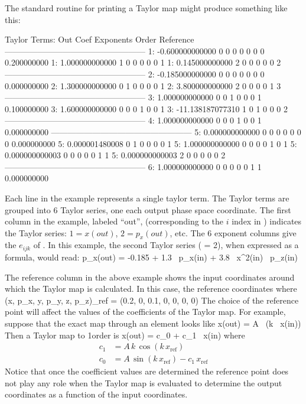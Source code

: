 The standard \bmad routine for printing a Taylor map might produce something 
like this: 
\begin{example}
   Taylor Terms:
    Out     Coef              Exponents           Order        Reference
   ---------------------------------------------------
      1:     -0.600000000000  0  0  0  0  0  0        0       0.200000000
      1:      1.000000000000  1  0  0  0  0  0        1
      1:      0.145000000000  2  0  0  0  0  0        2
   ---------------------------------------------------
      2:     -0.185000000000  0  0  0  0  0  0        0       0.000000000
      2:      1.300000000000  0  1  0  0  0  0        1
      2:      3.800000000000  2  0  0  0  0  1        3
   ---------------------------------------------------
      3:      1.000000000000  0  0  1  0  0  0        1       0.100000000
      3:      1.600000000000  0  0  0  1  0  0        1
      3:    -11.138187077310  1  0  1  0  0  0        2
   ---------------------------------------------------
      4:      1.000000000000  0  0  0  1  0  0        1       0.000000000
   ---------------------------------------------------
      5:      0.000000000000  0  0  0  0  0  0        0       0.000000000
      5:      0.000001480008  0  1  0  0  0  0        1
      5:      1.000000000000  0  0  0  0  1  0        1
      5:      0.000000000003  0  0  0  0  0  1        1
      5:      0.000000000003  2  0  0  0  0  0        2
   ---------------------------------------------------
      6:      1.000000000000  0  0  0  0  0  1        1       0.000000000
\end{example}
Each line in the example represents a single taylor term. The Taylor
terms are grouped into 6 Taylor series, one each output phase space
coordinate.  The first column in the example, labeled ``out'',
(corresponding to the $i$ index in ) indicates the Taylor
series: $1 = x(out)$, $2 = p_x(out)$, etc. The 6 exponent columns give
the $e_{ijk}$ of . In this example, the second Taylor series
( = 2), when expressed as a formula, would read:
\Begineq
  p_x(out) = -0.185 + 1.3 \, p_x(in) + 3.8 \, x^2(in) \, p_z(in)
\Endeq

The reference column in the above example shows the input coordinates around
which the Taylor map is calculated. In this case, the reference
coordinates where 
\Begineq
  (x, p_x, y, p_y, z, p_z)_{ref} = (0.2, 0, 0.1, 0, 0, 0, 0)
\Endeq
The choice of the reference point will affect the values of the
coefficients of the Taylor map. For example, suppose that the exact
map through an element looks like
\Begineq
  x(out) = A \, \sin(k \, x(in))
\Endeq
Then a Taylor map to 1\St order is
\Begineq
  x(out) = c_0 + c_1 \, x(in)
\Endeq
where
\begin{align}
  c_1 &= A \, k \, \cos(k \, x_{\mbox{ref}}) \\
  c_0 &= A \, \sin(k \, x_{\mbox{ref}}) - c_1 \, x_{\mbox{ref}} \nonumber
\end{align}
Notice that once the coefficient values are determined the reference
point does not play any role when the Taylor map is evaluated to
determine the output coordinates as a function of the input
coordinates.

